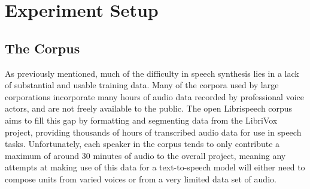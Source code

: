 \documentclass[10pt, journal, compsoc]{IEEEtran}
\begin{document}
\section{Experiment Setup}
\subsection{The Corpus}
As previously mentioned, much of the difficulty in speech synthesis lies in a lack of substantial and usable training data. Many of the corpora used by large corporations incorporate many hours of audio data recorded by professional voice actors, and are not freely available to the public. The open Librispeech corpus\cite{unknown} aims to fill this gap by formatting and segmenting data from the LibriVox project, providing thousands of hours of transcribed audio data for use in speech tasks. Unfortunately, each speaker in the corpus tends to only contribute a maximum of around 30 minutes of audio to the overall project, meaning any attempts at making use of this data for a text-to-speech model will either need to compose units from varied voices or from a very limited data set of audio.\par
\end{document}
